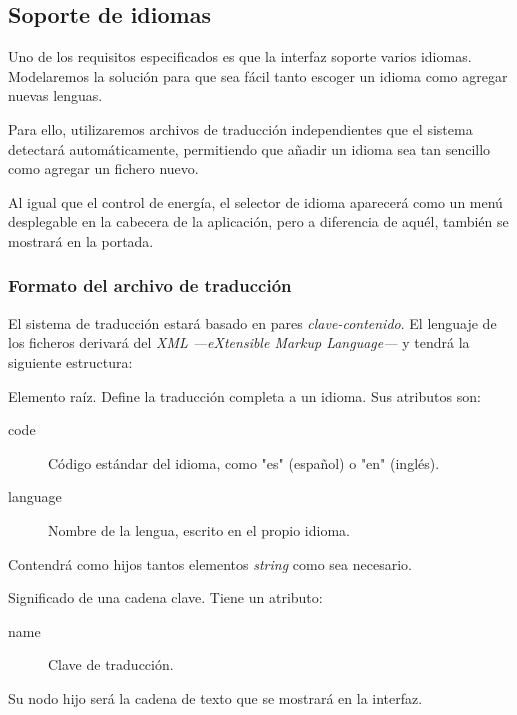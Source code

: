 \smallskip

\subsection{Soporte de idiomas}

Uno de los requisitos especificados es que la interfaz soporte varios idiomas. Modelaremos la solución para que sea fácil tanto escoger un idioma como agregar nuevas lenguas.

Para ello, utilizaremos archivos de traducción independientes que el sistema detectará automáticamente, permitiendo que añadir un idioma sea tan sencillo como agregar un fichero nuevo.

Al igual que el control de energía, el selector de idioma aparecerá como un menú desplegable en la cabecera de la aplicación, pero a diferencia de aquél, también se mostrará en la portada.

\subsubsection{Formato del archivo de traducción}

El sistema de traducción estará basado en pares \textit{clave-contenido}. El lenguaje de los ficheros derivará del \textit{XML ---eXtensible Markup Language---} y tendrá la siguiente estructura:

\begin{description}[style=nextline]
	\item[translation]
	Elemento raíz. Define la traducción completa a un idioma. Sus atributos son:
	
	\begin{description}
		\item[code] Código estándar del idioma, como "es" (español) o "en" (inglés).
		\item[language] Nombre de la lengua, escrito en el propio idioma.
	\end{description}
	
	Contendrá como hijos tantos elementos \textit{string} como sea necesario.
	
	\item[string]
	Significado de una cadena clave. Tiene un atributo:
	
	\begin{description}
		\item[name] Clave de traducción.
	\end{description}
	
	Su nodo hijo será la cadena de texto que se mostrará en la interfaz.
\end{description}

